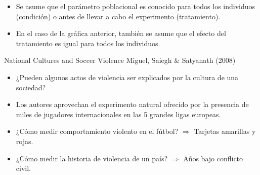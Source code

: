 \documentclass{beamer}
\begin{document}
\begin{frame}
\begin{columns}
\begin{column}{.4\textwidth}
{}
			
		\end{column}
	\end{columns}
\begin{itemize}
	\justifying
\item Se asume que el parámetro poblacional es conocido para todos los individuos (condición) o antes de llevar a cabo el experimento (tratamiento).
\item En el caso de la gráfica anterior, también se asume que el efecto del tratamiento es igual para todos los individuos.
\end{itemize}
\end{frame}

\begin{frame}{National Cultures and Soccer Violence}
	{\sc Miguel, Saiegh \& Satyanath (2008)}
	\begin{itemize}
\justifying
\item ¿Pueden algunos actos de violencia ser explicados por la cultura de una sociedad?
\item Los autores aprovechan el experimento natural ofrecido por la presencia de miles de jugadores internacionales en las 5 grandes ligas europeas.
\item ¿Cómo medir comportamiento violento en el fútbol? $\Rightarrow$ Tarjetas amarillas y rojas.
\item ¿Cómo medir la historia de violencia de un país? $\Rightarrow$ Años bajo conflicto civil. 
	\end{itemize}
\end{frame}
\end{document}
